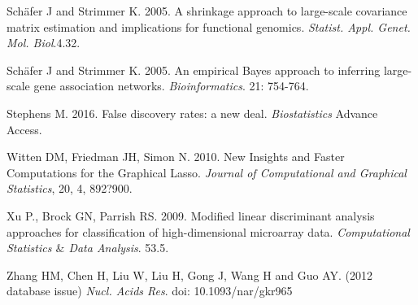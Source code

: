 \begin{thebibliography}{9}
Sch\"{a}fer J and Strimmer K.  2005. 
A shrinkage approach to large-scale covariance matrix estimation and implications for functional genomics. 
\textit{Statist. Appl. Genet. Mol. Biol}.4.32.

Sch\"{a}fer J and Strimmer K.  2005. 
An empirical Bayes approach to inferring large-scale gene association networks. 
\textit{Bioinformatics}. 21: 754-764.

Stephens M. 2016. 
False discovery rates: a new deal. 
\textit{Biostatistics} Advance Access.

Witten DM,  Friedman JH, Simon N. 2010.
New Insights and Faster Computations for the Graphical Lasso. 
\textit{Journal of Computational and Graphical Statistics}, 20, 4, 892?900.

Xu P.,  Brock GN,  Parrish RS.  2009.
Modified linear discriminant analysis approaches for classification of high-dimensional microarray data.
\textit{Computational Statistics $\&$ Data Analysis}. 53.5.

Zhang HM, Chen H, Liu W, Liu H, Gong J, Wang H and Guo AY. (2012 database issue)
\textit{Nucl. Acids Res}. doi: 10.1093/nar/gkr965

\end{thebibliography}



